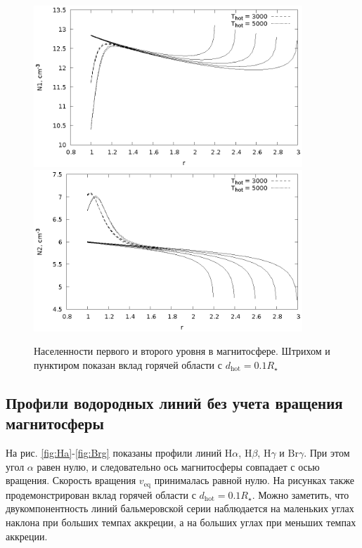 \documentclass{article}
\begin{document}
\begin{figure}[!h]
\centering
\includegraphics[width=0.9\textwidth]{N1.eps}
\includegraphics[width=0.9\textwidth]{N2.eps}
\caption{Населенности первого и второго уровня в магнитосфере. Штрихом и пунктиром показан вклад горячей области с $d_\text{hot} = 0.1 R_\star$}
\label{fig:N1N2}
\end{figure}
\FloatBarrier
\subsection{Профили водородных линий без учета вращения магнитосферы}

На рис. \ref{fig:Ha}-\ref{fig:Brg} показаны профили линий $\text{H}\alpha$, $\text{H}\beta$, $\text{H}\gamma$ и $\text{Br}\gamma$. При этом угол $\alpha$ равен нулю, и следовательно ось магнитосферы совпадает с осью вращения. Скорость вращения $v_\text{eq}$ принималась равной нулю. На рисунках также продемонстрирован вклад горячей области с $d_\text{hot} = 0.1 R_\star$. Можно заметить, что двукомпонентность линий бальмеровской серии наблюдается на маленьких углах наклона при больших темпах аккреции, а на больших углах при меньших темпах аккреции.
\end{document}
